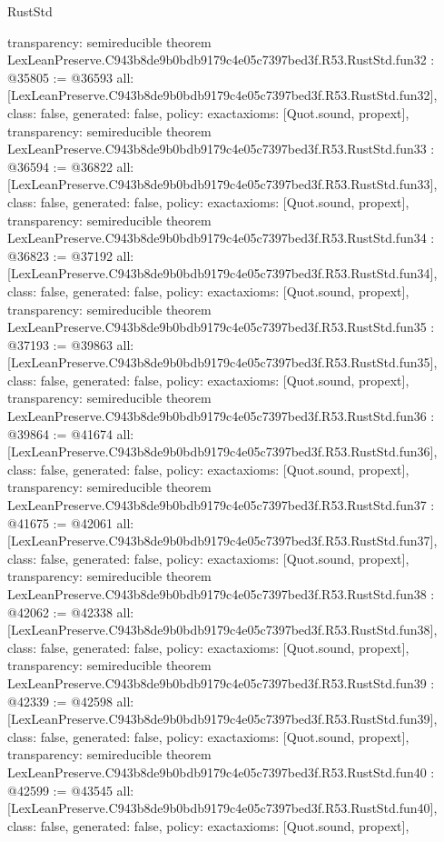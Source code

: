 \begin{lexlean}{RustStd}
\begin{coremodule}
{  transparency: semireducible
}
theorem LexLeanPreserve.C943b8de9b0bdb9179c4e05c7397bed3f.R53.RustStd.fun32 : @35805 := @36593 {
  all: [LexLeanPreserve.C943b8de9b0bdb9179c4e05c7397bed3f.R53.RustStd.fun32],
  class: false,
  generated: false,
  policy: exact{axioms: [Quot.sound, propext]},
  transparency: semireducible
}
theorem LexLeanPreserve.C943b8de9b0bdb9179c4e05c7397bed3f.R53.RustStd.fun33 : @36594 := @36822 {
  all: [LexLeanPreserve.C943b8de9b0bdb9179c4e05c7397bed3f.R53.RustStd.fun33],
  class: false,
  generated: false,
  policy: exact{axioms: [Quot.sound, propext]},
  transparency: semireducible
}
theorem LexLeanPreserve.C943b8de9b0bdb9179c4e05c7397bed3f.R53.RustStd.fun34 : @36823 := @37192 {
  all: [LexLeanPreserve.C943b8de9b0bdb9179c4e05c7397bed3f.R53.RustStd.fun34],
  class: false,
  generated: false,
  policy: exact{axioms: [Quot.sound, propext]},
  transparency: semireducible
}
theorem LexLeanPreserve.C943b8de9b0bdb9179c4e05c7397bed3f.R53.RustStd.fun35 : @37193 := @39863 {
  all: [LexLeanPreserve.C943b8de9b0bdb9179c4e05c7397bed3f.R53.RustStd.fun35],
  class: false,
  generated: false,
  policy: exact{axioms: [Quot.sound, propext]},
  transparency: semireducible
}
theorem LexLeanPreserve.C943b8de9b0bdb9179c4e05c7397bed3f.R53.RustStd.fun36 : @39864 := @41674 {
  all: [LexLeanPreserve.C943b8de9b0bdb9179c4e05c7397bed3f.R53.RustStd.fun36],
  class: false,
  generated: false,
  policy: exact{axioms: [Quot.sound, propext]},
  transparency: semireducible
}
theorem LexLeanPreserve.C943b8de9b0bdb9179c4e05c7397bed3f.R53.RustStd.fun37 : @41675 := @42061 {
  all: [LexLeanPreserve.C943b8de9b0bdb9179c4e05c7397bed3f.R53.RustStd.fun37],
  class: false,
  generated: false,
  policy: exact{axioms: [Quot.sound, propext]},
  transparency: semireducible
}
theorem LexLeanPreserve.C943b8de9b0bdb9179c4e05c7397bed3f.R53.RustStd.fun38 : @42062 := @42338 {
  all: [LexLeanPreserve.C943b8de9b0bdb9179c4e05c7397bed3f.R53.RustStd.fun38],
  class: false,
  generated: false,
  policy: exact{axioms: [Quot.sound, propext]},
  transparency: semireducible
}
theorem LexLeanPreserve.C943b8de9b0bdb9179c4e05c7397bed3f.R53.RustStd.fun39 : @42339 := @42598 {
  all: [LexLeanPreserve.C943b8de9b0bdb9179c4e05c7397bed3f.R53.RustStd.fun39],
  class: false,
  generated: false,
  policy: exact{axioms: [Quot.sound, propext]},
  transparency: semireducible
}
theorem LexLeanPreserve.C943b8de9b0bdb9179c4e05c7397bed3f.R53.RustStd.fun40 : @42599 := @43545 {
  all: [LexLeanPreserve.C943b8de9b0bdb9179c4e05c7397bed3f.R53.RustStd.fun40],
  class: false,
  generated: false,
  policy: exact{axioms: [Quot.sound, propext]},
}
\end{coremodule}
\end{lexlean}
